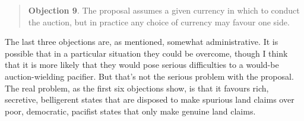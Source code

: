 \begin{quote}
\textbf{Objection 9}. The proposal assumes a given currency in which to conduct the auction, but in practice any choice of currency may favour one side.
\end{quote}

\noindent The last three objections are, as mentioned, somewhat administrative. It is possible that in a particular situation they could be overcome, though I think that it is more likely that they would pose serious difficulties to a would-be auction-wielding pacifier. But that's not the serious problem with the proposal. The real problem, as the first six objections show, is that it favours rich, secretive, belligerent states that are disposed to make spurious land claims over poor, democratic, pacifist states that only make genuine land claims. 